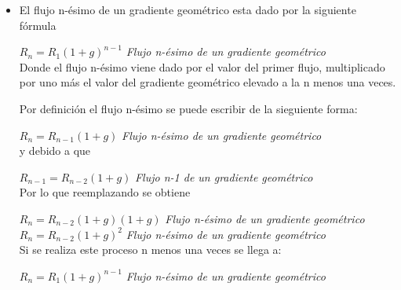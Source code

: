\begin{itemize}
 \item El flujo n-ésimo de un gradiente geométrico esta dado por la siguiente fórmula

       \vspace{4mm}

       $R_{n} = R_{1}(1+g)^{n-1}$ \hspace{37 pt} \textit{Flujo n-ésimo de un gradiente geométrico}\\

       Donde el flujo n-ésimo viene dado por el valor del primer flujo, multiplicado por uno más el valor del gradiente geométrico elevado a la n menos una veces.

       \vspace{4mm}

       Por definición el flujo n-ésimo se puede escribir de la sieguiente forma:

       \vspace{4mm}

       $R_{n} = R_{n-1}(1+g)$ \hspace{44 pt} \textit{Flujo n-ésimo de un gradiente geométrico}\\

       y debido a que

       \vspace{4mm}

       $R_{n-1} = R_{n-2}(1+g)$ \hspace{31 pt} \textit{Flujo n-1 de un gradiente geométrico}\\

       Por lo que reemplazando se obtiene

       \vspace{4mm}

       $R_{n} = R_{n-2}(1+g)(1+g)$ \hspace{9 pt} \textit{Flujo n-ésimo de un gradiente geométrico}\\

       $R_{n} = R_{n-2}(1+g)^{2}$ \hspace{35 pt} \textit{Flujo n-ésimo de un gradiente geométrico}\\

       Si se realiza este proceso n menos una veces se llega a:

       \vspace{4mm}

       $R_{n} = R_{1}(1+g)^{n-1}$ \hspace{35 pt} \textit{Flujo n-ésimo de un gradiente geométrico}\\

\end{itemize}

\setlength{\columnsep}{0.75cm}
\printindex





